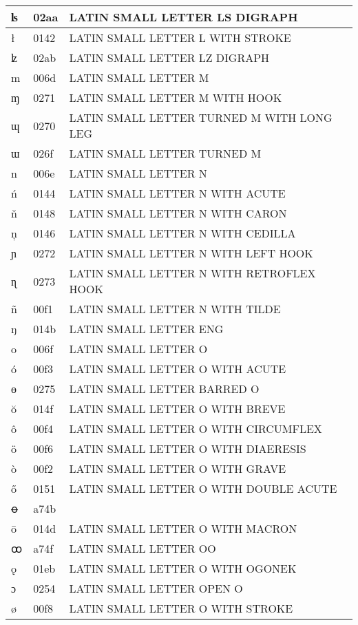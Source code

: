 \documentclass[12pt,letterpaper,openany]{book}
\begin{document}
\begin{center}
\begin{supertabular}{|m{0.25in}|m{0.5in}|m{4in}|}
ʪ & 02aa & LATIN SMALL LETTER LS DIGRAPH\\\hline
ł & 0142 & LATIN SMALL LETTER L WITH STROKE\\\hline
ʫ & 02ab & LATIN SMALL LETTER LZ DIGRAPH\\\hline
m & 006d & LATIN SMALL LETTER M\\\hline
ɱ & 0271 & LATIN SMALL LETTER M WITH HOOK\\\hline
ɰ & 0270 & LATIN SMALL LETTER TURNED M WITH LONG LEG\\\hline
ɯ & 026f & LATIN SMALL LETTER TURNED M\\\hline
n & 006e & LATIN SMALL LETTER N\\\hline
ń & 0144 & LATIN SMALL LETTER N WITH ACUTE\\\hline
ň & 0148 & LATIN SMALL LETTER N WITH CARON\\\hline
ņ & 0146 & LATIN SMALL LETTER N WITH CEDILLA\\\hline
ɲ & 0272 & LATIN SMALL LETTER N WITH LEFT HOOK\\\hline
ɳ & 0273 & LATIN SMALL LETTER N WITH RETROFLEX HOOK\\\hline
ñ & 00f1 & LATIN SMALL LETTER N WITH TILDE\\\hline
ŋ & 014b & LATIN SMALL LETTER ENG\\\hline
o & 006f & LATIN SMALL LETTER O\\\hline
ó & 00f3 & LATIN SMALL LETTER O WITH ACUTE\\\hline
ɵ & 0275 & LATIN SMALL LETTER BARRED O\\\hline
ŏ & 014f & LATIN SMALL LETTER O WITH BREVE\\\hline
ô & 00f4 & LATIN SMALL LETTER O WITH CIRCUMFLEX\\\hline
ö & 00f6 & LATIN SMALL LETTER O WITH DIAERESIS\\\hline
ò & 00f2 & LATIN SMALL LETTER O WITH GRAVE\\\hline
ő & 0151 & LATIN SMALL LETTER O WITH DOUBLE ACUTE\\\hline
ꝋ & a74b & \\\hline
ō & 014d & LATIN SMALL LETTER O WITH MACRON\\\hline
ꝏ & a74f & LATIN SMALL LETTER OO\\\hline
ǫ & 01eb & LATIN SMALL LETTER O WITH OGONEK\\\hline
ɔ & 0254 & LATIN SMALL LETTER OPEN O\\\hline
ø & 00f8 & LATIN SMALL LETTER O WITH STROKE\\\hline

\end{supertabular}
\end{center}
\end{document}
